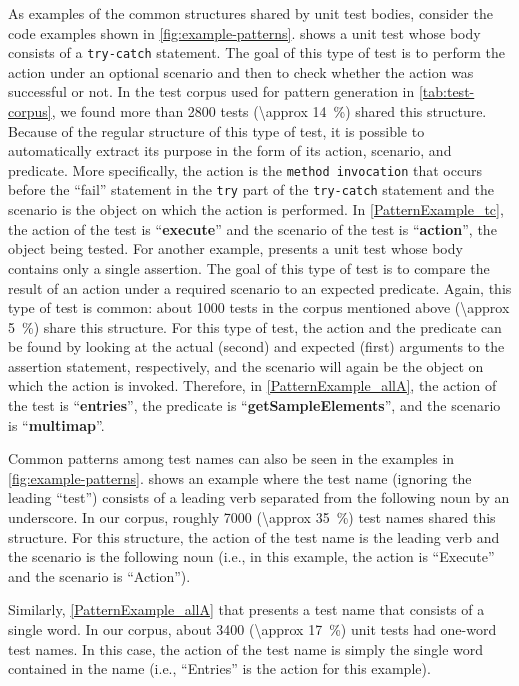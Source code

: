 As examples of the common structures shared by unit test bodies, consider the code examples shown in \cref{fig:example-patterns}.
%
 shows a unit test whose body consists of a \texttt{try-catch} statement.
%
The goal of this type of test is to perform the action under an optional scenario and then to check whether the action was successful or not.
%
In the test corpus used for pattern generation in \cref{tab:test-corpus}, we found more than \num{2800} tests (\SI{\approx 14}{\percent}) shared this structure.
%
Because of the regular structure of this type of test, it is possible to automatically extract its purpose in the form of its action, scenario, and predicate.
%
More specifically, the action is the \texttt{method invocation} that occurs before the \enquote{fail} statement in the \texttt{try} part of the \texttt{try-catch} statement and the scenario is the object on which the action is performed.
%
In \cref{PatternExample_tc}, the action of the test is \enquote{\textbf{execute}} and the scenario of the test is \enquote{\textbf{action}}, the object being tested.
%
For another example,  presents a unit test whose body contains only a single assertion.
%
The goal of this type of test is to compare the result of an action under a required scenario to an expected predicate.
% 
Again, this type of test is common: about \num{1000} tests in the corpus mentioned above (\SI{\approx 5}{\percent}) share this structure.
%
For this type of test, the action and the predicate can be found by looking at the actual (second) and expected (first) arguments to the assertion statement, respectively, and the scenario will again be the object on which the action is invoked.
%
Therefore, in \cref{PatternExample_allA}, the action of the test is \enquote{\textbf{entries}}, the predicate is \enquote{\textbf{getSampleElements}}, and the scenario is \enquote{\textbf{multimap}}.


Common patterns among test names can also be seen in the examples in \cref{fig:example-patterns}.
%
 shows an example where the test name (ignoring the leading \enquote{test}) consists of a leading verb separated from the following noun by an underscore.
%
In our corpus, roughly \num{7000} (\SI{\approx 35}{\percent}) test names shared this structure.
%
For this structure, the action of the test name is the leading verb and the scenario is the following noun (i.e., in this example, the action is \enquote{Execute} and the scenario is \enquote{Action}).

Similarly, \cref{PatternExample_allA} that presents a test name that consists of a single word.
%
In our corpus, about \num{3400} (\SI{\approx 17}{\percent}) unit tests had one-word test names.
%
In this case, the action of the test name is simply the single word contained in the name (i.e., \enquote{Entries} is the action for this example).


